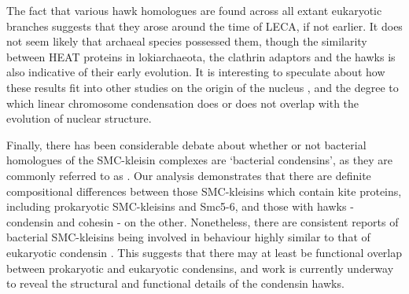 \documentclass[a4paper,11pt,twoside,openright]{scrbook}
\begin{document}
The fact that various hawk homologues are found across all extant eukaryotic branches suggests that they arose around the time of LECA, if not earlier. It does not seem likely that archaeal species possessed them, though the similarity between HEAT proteins in lokiarchaeota, the clathrin adaptors and the hawks is also indicative of their early evolution. It is interesting to speculate about how these results fit into other studies on the origin of the nucleus \cite{Devos2014,Baum2014}, and the degree to which linear chromosome condensation does or does not overlap with the evolution of nuclear structure.

Finally, there has been considerable debate about whether or not bacterial homologues of the SMC-kleisin complexes are `bacterial condensins', as they are commonly referred to as \cite{Case2004,Hirano2016,Niki2016}. Our analysis demonstrates that there are definite compositional differences between those SMC-kleisins which contain kite proteins, including prokaryotic SMC-kleisins and Smc5-6, and those with hawks - condensin and cohesin - on the other. Nonetheless, there are consistent reports of bacterial SMC-kleisins being involved in behaviour highly similar to that of eukaryotic condensin \cite{Case2004,Wang2017}. This suggests that there may at least be functional overlap between prokaryotic and eukaryotic condensins, and work is currently underway to reveal the structural and functional details of the condensin hawks.


\end{document}
